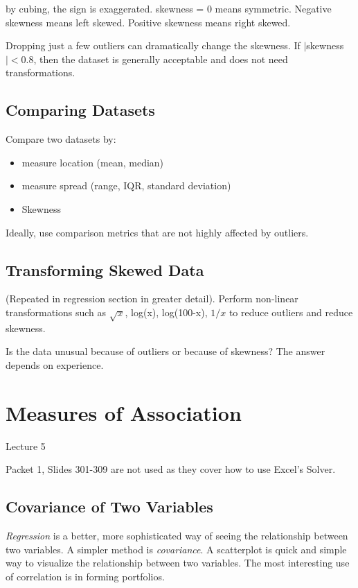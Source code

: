 \documentclass[11pt, oneside]{article}   	%
\begin{document}
by cubing, the sign is exaggerated. skewness = 0 means symmetric. Negative skewness means left skewed. Positive skewness means right skewed.

Dropping just a few outliers can dramatically change the skewness. If $|$skewness$|  < 0.8$, then the dataset is generally acceptable and does not need transformations.

\subsection{Comparing Datasets}

Compare two datasets by:
\begin{itemize}
\item{measure location (mean, median)}
\item{measure spread (range, IQR, standard deviation)}
\item{Skewness}
\end{itemize}

Ideally, use comparison metrics that are not highly affected by outliers.

\subsection{Transforming Skewed Data}

(Repeated in regression section in greater detail). Perform non-linear transformations such as $\sqrt{x}$, log(x), log(100-x), $1/x$ to reduce outliers and reduce skewness.

Is the data unusual because of outliers or because of skewness? The answer depends on experience.

\section{Measures of Association}
Lecture 5

Packet 1, Slides 301-309 are not used as they cover how to use Excel's Solver.

\subsection{Covariance of Two Variables}

\textit{Regression} is a better, more sophisticated way of seeing the relationship between two variables. A simpler method is \textit{covariance}. A scatterplot is quick and simple way to visualize the relationship between two variables. The most interesting use of correlation is in forming portfolios.
\end{document}
